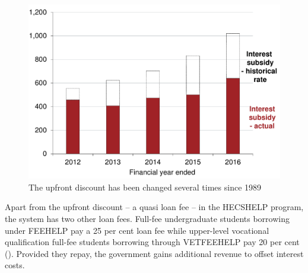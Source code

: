 \documentclass[embargoed]{grattan}
\begin{document}
\begin{figure}
\caption{The upfront discount has been changed several times since 1989}\label{fig:fig18-the-upfront-discount-has-been-changed-several-times-since-1989}

\includegraphics[page=18]{atlas/Chartpack.pdf}

\end{figure}

Apart from the upfront discount -- a quasi loan fee -- in the \gls{HECSHELP} program, the system has two other loan fees.
Full-fee undergraduate students borrowing under \gls{FEEHELP} pay a 25 per cent loan fee while upper-level vocational qualification full-fee students borrowing through \gls{VETFEEHELP} pay 20 per cent ().
Provided they repay, the government gains additional revenue to offset interest costs.
\end{document}
